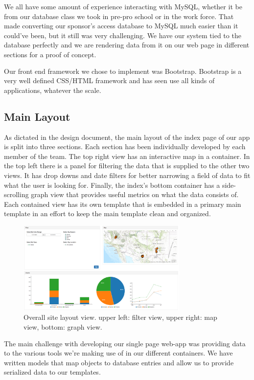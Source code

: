 \documentclass[10pt,draftclsnofoot,onecolumn]{IEEEtran}
\begin{document}
We all have some amount of experience interacting with MySQL, whether it be from our database class we took in pre-pro school or in the work force. That made converting our sponsor’s access database to MySQL much easier than it could’ve been, but it still was very challenging.
We have our system tied to the database perfectly and we are rendering data from it on our web page in different sections for a proof of concept.

Our front end framework we chose to implement was Bootstrap.
Bootstrap is a very well defined CSS/HTML framework and has seen use all kinds of applications, whatever the scale.

\subsection{Main Layout} %
As dictated in the design document, the main layout of the index page of our app is split into three sections.
Each section has been individually developed by each member of the team.
The top right view has an interactive map in a container.
In the top left there is a panel for filtering the data that is supplied to the other two views.
It has drop downs and date filters for better narrowing a field of data to fit what the user is looking for.
Finally, the index’s bottom container has a side-scrolling graph view that provides useful metrics on what the data consists of.
Each contained view has its own template that is embedded in a primary main template in an effort to keep the main template clean and organized.

\begin{figure}[h]
\centering
\includegraphics[width=0.75\textwidth]{images/main_layout.png}
\captionsetup{justification=centering}
\caption{
  Overall site layout view.
  upper left: filter view, upper right: map view, bottom: graph view.
}
\label{fig:layout}
\end{figure}

The main challenge with developing our single page web-app was providing data to the various tools we’re making use of in our different containers.
We have written models that map objects to database entries and allow us to provide serialized data to our templates.
\end{document}
